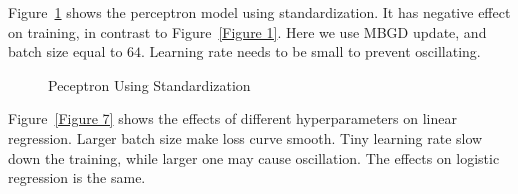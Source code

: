\documentclass{article}
\begin{document}
Figure~\ref{Figure 6} shows the perceptron model using standardization. It has
negative effect on training, in contrast to Figure~\ref{Figure 1}. Here we use
MBGD update, and batch size equal to $64$. Learning rate needs to be small to
prevent oscillating.

\begin{figure}[H]
    \centering
    \hspace{8mm}
    \hspace{22mm}
    \caption{Peceptron Using Standardization}
    \label{Figure 6}
\end{figure}

Figure~\ref{Figure 7} shows the effects of different hyperparameters on
linear regression. Larger batch size make loss curve smooth. Tiny learning
rate slow down the training, while larger one may cause oscillation.
The effects on logistic regression is the same.
\end{document}
